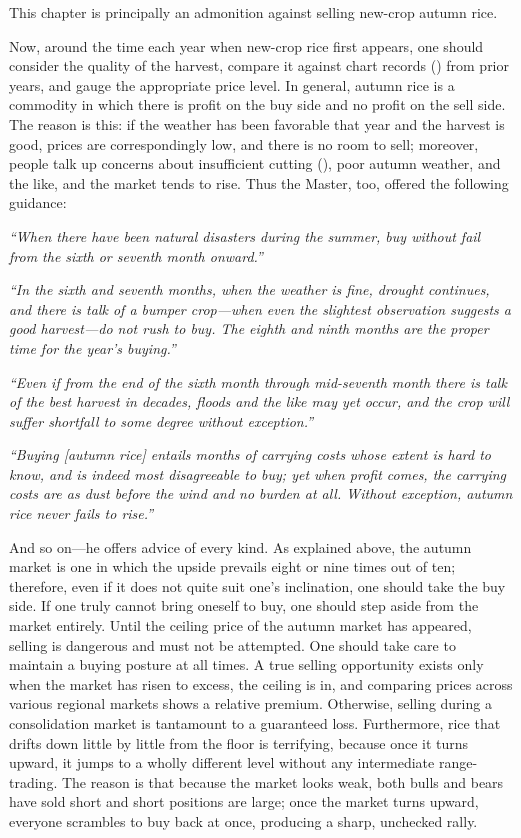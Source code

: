 \commentary
This chapter is principally an admonition against selling new-crop
autumn rice.

Now, around the time each year when new-crop rice first appears, one
should consider the quality of the harvest, compare it against chart
records () from prior years, and gauge the
appropriate price level. In general, autumn rice is a commodity in which
there is profit on the buy side and no profit on the sell side. The
reason is this: if the weather has been favorable that year and the
harvest is good, prices are correspondingly low, and there is no room to
sell; moreover, people talk up concerns about insufficient cutting
(), poor autumn weather, and the like, and
the market tends to rise. Thus the Master, too, offered the following
guidance:

\textit{``When there have been natural disasters during the summer, buy
without fail from the sixth or seventh month onward.''}

\textit{``In the sixth and seventh months, when the weather is fine,
drought continues, and there is talk of a bumper crop---when even the
slightest observation suggests a good harvest---do not rush to buy. The
eighth and ninth months are the proper time for the year's buying.''}

\textit{``Even if from the end of the sixth month through mid-seventh
month there is talk of the best harvest in decades, floods and the like
may yet occur, and the crop will suffer shortfall to some degree without
exception.''}

\textit{``Buying [autumn rice] entails months of carrying costs whose
extent is hard to know, and is indeed most disagreeable to buy; yet when
profit comes, the carrying costs are as dust before the wind and no
burden at all. Without exception, autumn rice never fails to rise.''}

And so on---he offers advice of every kind. As explained above, the
autumn market is one in which the upside prevails eight or nine times
out of ten; therefore, even if it does not quite suit one's inclination,
one should take the buy side. If one truly cannot bring oneself to buy,
one should step aside from the market entirely. Until the ceiling price
of the autumn market has appeared, selling is dangerous and must not be
attempted. One should take care to maintain a buying posture at all
times. A true selling opportunity exists only when the market has risen
to excess, the ceiling is in, and comparing prices across various
regional markets shows a relative premium. Otherwise, selling during a
consolidation market is tantamount to a guaranteed loss. Furthermore,
rice that drifts down little by little from the floor is terrifying,
because once it turns upward, it jumps to a wholly different level
without any intermediate range-trading. The reason is that because the
market looks weak, both bulls and bears have sold short and short
positions are large; once the market turns upward, everyone scrambles to
buy back at once, producing a sharp, unchecked rally.

